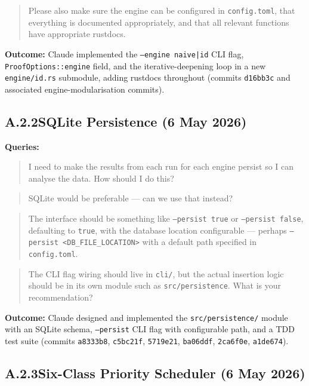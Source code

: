 \begin{quote}
  Please also make sure the engine can be configured in \texttt{config.toml},
  that everything is documented appropriately, and that all relevant functions
  have appropriate rustdocs.
\end{quote}

\textbf{Outcome:} Claude implemented the \texttt{--engine naive|id} CLI flag,
\texttt{ProofOptions::engine} field, and the iterative-deepening loop in a new
\texttt{engine/id.rs} submodule, adding rustdocs throughout
(commits \texttt{d16bb3c} and associated engine-modularisation commits).

\subsection*{A.2.2\quad SQLite Persistence (6 May 2026)}

\textbf{Queries:}
\begin{quote}
  I need to make the results from each run for each engine persist so I can
  analyse the data. How should I do this?
\end{quote}

\begin{quote}
  SQLite would be preferable --- can we use that instead?
\end{quote}

\begin{quote}
  The interface should be something like \texttt{--persist true} or
  \texttt{--persist false}, defaulting to \texttt{true}, with the database
  location configurable --- perhaps \texttt{--persist <DB\_FILE\_LOCATION>} with
  a default path specified in \texttt{config.toml}.
\end{quote}

\begin{quote}
  The CLI flag wiring should live in \texttt{cli/}, but the actual insertion
  logic should be in its own module such as \texttt{src/persistence}.
  What is your recommendation?
\end{quote}

\textbf{Outcome:} Claude designed and implemented the \texttt{src/persistence/}
module with an SQLite schema, \texttt{--persist} CLI flag with configurable
path, and a TDD test suite (commits \texttt{a8333b8}, \texttt{c5bc21f},
\texttt{5719e21}, \texttt{ba06ddf}, \texttt{2ca6f0e}, \texttt{a1de674}).

\subsection*{A.2.3\quad Six-Class Priority Scheduler (6 May
2026)}\label{app:ai-scheduler}

